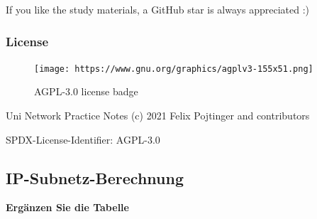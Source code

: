If you like the study materials, a GitHub star is always appreciated :)

\hypertarget{license}{%
\subsubsection{License}\label{license}}

\begin{figure}
\centering
\texttt{[image: https://www.gnu.org/graphics/agplv3-155x51.png]}
\caption{AGPL-3.0 license badge}
\end{figure}

Uni Network Practice Notes (c) 2021 Felix Pojtinger and contributors

SPDX-License-Identifier: AGPL-3.0

\newpage

\hypertarget{ip-subnetz-berechnung}{%
\subsection{IP-Subnetz-Berechnung}\label{ip-subnetz-berechnung}}

\textbf{Ergänzen Sie die Tabelle}

